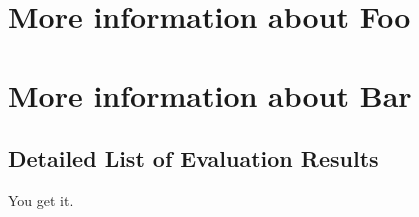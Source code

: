 
\chapter{More information about Foo}


\chapter{More information about Bar}

\section{Detailed List of Evaluation Results}
You get it.